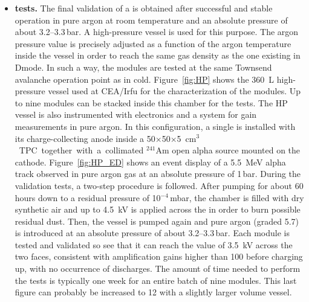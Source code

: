 \begin{itemize}
\item {\bf {} tests.} The final validation of a  is obtained after  successful and stable operation in pure argon at room temperature and an absolute pressure of about \numrange{3.2}{3.3}\,bar. A high-pressure vessel is used for this purpose.  The argon pressure value is precisely adjusted as a function of the argon temperature inside the vessel in order to reach the same gas density as the one existing in D\lar mode. In such a way, the  modules are tested at the same Townsend avalanche operation point as in cold. Figure~\ref{fig:HP} shows the \SI{360}{L} high-pressure vessel used at CEA/Irfu for the characterization of the    modules. Up to nine  modules can be stacked inside this chamber for the  tests. The HP vessel is also instrumented with  electronics and a  system for gain measurements in pure argon. In this configuration, a single  is installed with its \twod charge-collecting anode inside 
a \num{50}$\times$\num{50}$\times$\SI{5}{cm$^3$} 
TPC together with a collimated $^{241}$Am open alpha source mounted on 
the cathode. Figure~\ref{fig:HP_ED} shows an event display of a \SI{5.5}{MeV} alpha track observed in pure argon gas at an 
absolute pressure of \num{1}\,bar.
%
During the  validation  tests, a two-step procedure is followed. After pumping for 
about \num{60} hours down to a residual pressure of \num{10}$^{-4}$\,mbar, the chamber is filled with dry synthetic air and 
  up to \SI{4.5}{kV} is applied across the  in order to 
burn possible residual dust. Then, the vessel is pumped again and pure argon (graded \num{5.7})
is introduced at an absolute pressure of about \numrange{3.2}{3.3}\,bar. Each  module is tested 
and validated so see that it can reach the value of \SI{3.5}{kV} across the two faces, consistent with amplification gains higher than \num{100} before charging up, with no occurrence of discharges. The amount of time needed to perform the   tests is 
typically one week for an entire batch of nine  modules. This last figure can probably be increased to \num{12} with a slightly larger volume vessel. 
\end{itemize}


